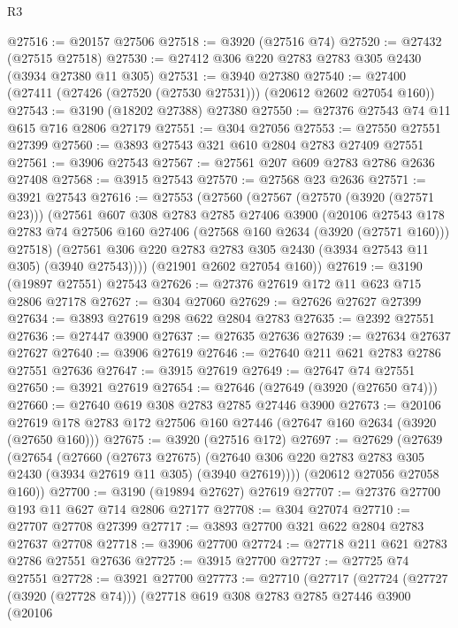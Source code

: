 \begin{lexlean}{R3}
\begin{coremodule}
@27516 := @20157 @27506
@27518 := @3920 (@27516 @74)
@27520 := @27432 (@27515 @27518)
@27530 := @27412 @306 @220 @2783 @2783 @305 @2430 (@3934 @27380 @11 @305)
@27531 := @3940 @27380
@27540 := @27400 (@27411 (@27426 (@27520 (@27530 @27531))) (@20612 @2602 @27054 @160))
@27543 := @3190 (@18202 @27388) @27380
@27550 := @27376 @27543 @74 @11 @615 @716 @2806 @27179
@27551 := @304 @27056
@27553 := @27550 @27551 @27399
@27560 := @3893 @27543 @321 @610 @2804 @2783 @27409 @27551
@27561 := @3906 @27543
@27567 := @27561 @207 @609 @2783 @2786 @2636 @27408
@27568 := @3915 @27543
@27570 := @27568 @23 @2636
@27571 := @3921 @27543
@27616 := @27553
    (@27560
      (@27567
        (@27570 (@3920 (@27571 @23)))
        (@27561
          @607
          @308
          @2783
          @2785
          @27406
          @3900
          (@20106
            @27543
            @178
            @2783
            @74
            @27506
            @160
            @27406
            (@27568 @160 @2634 (@3920 (@27571 @160)))
            @27518)
          (@27561 @306 @220 @2783 @2783 @305 @2430 (@3934 @27543 @11 @305) (@3940 @27543))))
      (@21901 @2602 @27054 @160))
@27619 := @3190 (@19897 @27551) @27543
@27626 := @27376 @27619 @172 @11 @623 @715 @2806 @27178
@27627 := @304 @27060
@27629 := @27626 @27627 @27399
@27634 := @3893 @27619 @298 @622 @2804 @2783
@27635 := @2392 @27551
@27636 := @27447 @3900
@27637 := @27635 @27636
@27639 := @27634 @27637 @27627
@27640 := @3906 @27619
@27646 := @27640 @211 @621 @2783 @2786 @27551 @27636
@27647 := @3915 @27619
@27649 := @27647 @74 @27551
@27650 := @3921 @27619
@27654 := @27646 (@27649 (@3920 (@27650 @74)))
@27660 := @27640 @619 @308 @2783 @2785 @27446 @3900
@27673 := @20106 @27619 @178 @2783 @172 @27506 @160 @27446 (@27647 @160 @2634 (@3920 (@27650 @160)))
@27675 := @3920 (@27516 @172)
@27697 := @27629
    (@27639
      (@27654
        (@27660
          (@27673 @27675)
          (@27640 @306 @220 @2783 @2783 @305 @2430 (@3934 @27619 @11 @305) (@3940 @27619))))
      (@20612 @27056 @27058 @160))
@27700 := @3190 (@19894 @27627) @27619
@27707 := @27376 @27700 @193 @11 @627 @714 @2806 @27177
@27708 := @304 @27074
@27710 := @27707 @27708 @27399
@27717 := @3893 @27700 @321 @622 @2804 @2783 @27637 @27708
@27718 := @3906 @27700
@27724 := @27718 @211 @621 @2783 @2786 @27551 @27636
@27725 := @3915 @27700
@27727 := @27725 @74 @27551
@27728 := @3921 @27700
@27773 := @27710
    (@27717
      (@27724
        (@27727 (@3920 (@27728 @74)))
        (@27718
          @619
          @308
          @2783
          @2785
          @27446
          @3900
          (@20106

\end{coremodule}
\end{lexlean}

